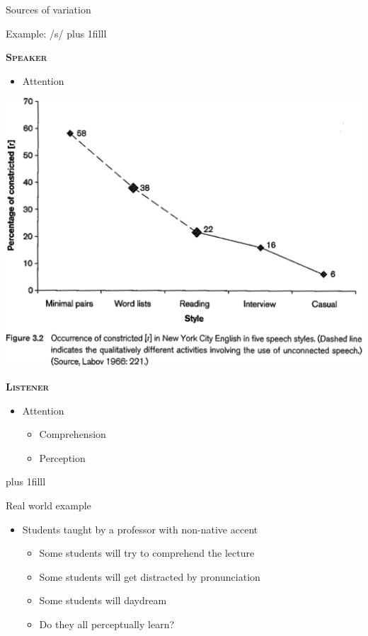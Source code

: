 \documentclass{beamer}
\newcommand{\btVFill}{\vskip0pt plus 1filll}
\begin{document}
\begin{frame}{Sources of variation}

Example: /s/
\btVFill
\begin{minipage}[t]{0.45\textwidth}
\textbf{\textsc{Speaker}}

\begin{itemize}
\item Attention
\end{itemize}
\includegraphics[width=1.3\textwidth]{pictures/Labov1997-mod}
\end{minipage}
\hfill
\begin{minipage}[t]{0.45\textwidth}
\textbf{\textsc{Listener}}

\begin{itemize}
\item Attention
\begin{itemize}
\item Comprehension
\item Perception
\end{itemize}
\end{itemize}
\end{minipage}
\btVFill
\begin{flushright}
\scriptsize
\citet{Labov1997, Pitt2012}
\end{flushright}
\end{frame}

\begin{frame}{Real world example}

\begin{itemize}
\item Students taught by a professor with non-native accent
\begin{itemize}
\item Some students will try to comprehend the lecture
\item Some students will get distracted by pronunciation
\item Some students will daydream
\item Do they all perceptually learn?
\end{itemize}
\end{itemize}

\end{frame}
\end{document}

